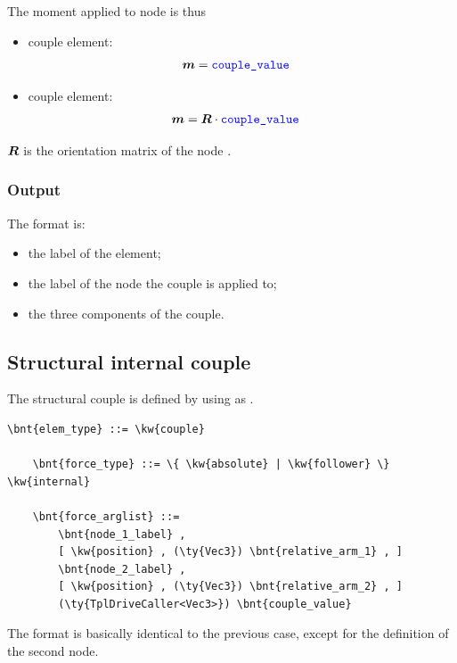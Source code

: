 The moment applied to node  is thus
\begin{itemize}
\item {} couple element:
\begin{align}
	\boldsymbol{m} & = \textcolor{blue}{\texttt{couple\_value}}
\end{align}

\item {} couple element:
\begin{align}
	\boldsymbol{m} & = \boldsymbol{R} \cdot \textcolor{blue}{\texttt{couple\_value}}
\end{align}
\end{itemize}
$\boldsymbol{R}$ is the orientation matrix of the node .

\subsubsection{Output}
The format is:
\begin{itemize}
    \item the label of the element;
    \item the label of the node the couple is applied to;
    \item the three components of the couple.
\end{itemize}

\subsection{Structural internal couple}
\label{sec:EL:FORCE:STRUCTURAL:INTERNAL_COUPLE}
The structural couple is defined by using  as .
\begin{Verbatim}[commandchars=\\\{\}]
    \bnt{elem_type} ::= \kw{couple}

    \bnt{force_type} ::= \{ \kw{absolute} | \kw{follower} \} \kw{internal}

    \bnt{force_arglist} ::=
        \bnt{node_1_label} ,
        [ \kw{position} , (\ty{Vec3}) \bnt{relative_arm_1} , ]
        \bnt{node_2_label} ,
        [ \kw{position} , (\ty{Vec3}) \bnt{relative_arm_2} , ]
        (\ty{TplDriveCaller<Vec3>}) \bnt{couple_value}
\end{Verbatim}
The format is basically identical to the previous case,
except for the definition of the second node.

